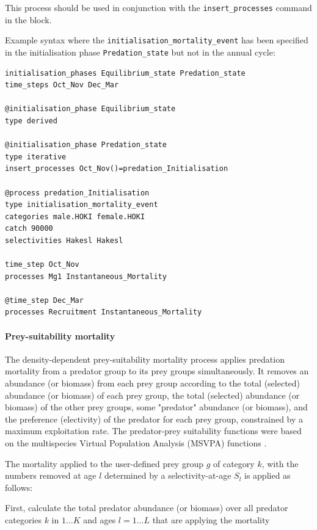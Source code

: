 This process should be used in conjunction with the \texttt{insert\_processes} command in the  block.

Example syntax where the \texttt{initialisation\_mortality\_event} has been specified in the initialisation phase \texttt{Predation\_state} but not in the annual cycle:

{\small{\begin{verbatim}
initialisation_phases Equilibrium_state Predation_state
time_steps Oct_Nov Dec_Mar

@initialisation_phase Equilibrium_state
type derived

@initialisation_phase Predation_state
type iterative
insert_processes Oct_Nov()=predation_Initialisation

@process predation_Initialisation
type initialisation_mortality_event
categories male.HOKI female.HOKI
catch 90000
selectivities Hakesl Hakesl

time_step Oct_Nov
processes Mg1 Instantaneous_Mortality

@time_step Dec_Mar
processes Recruitment Instantaneous_Mortality
\end{verbatim}}}

\paragraph{Prey-suitability mortality}

The density-dependent prey-suitability mortality process applies predation mortality from a predator group to its prey groups simultaneously. It removes an abundance (or biomass) from each prey group according to the total (selected) abundance (or biomass) of each prey group, the total (selected) abundance (or biomass) of the other prey groups, some "predator" abundance (or biomass), and the preference (electivity) of the predator for each prey group, constrained by a maximum exploitation rate. The predator-prey suitability functions were based on the multispecies Virtual Population Analysis (MSVPA) functions \citep{JuradoMolina2005}.

The mortality applied to the user-defined prey group $g$ of category $k$, with the numbers removed at age $l$ determined by a selectivity-at-age $S_l$ is applied as follows:

First, calculate the total predator abundance (or biomass) over all predator categories $k$ in $1 \ldots K$ and ages $l = 1 \ldots L$ that are applying the mortality

